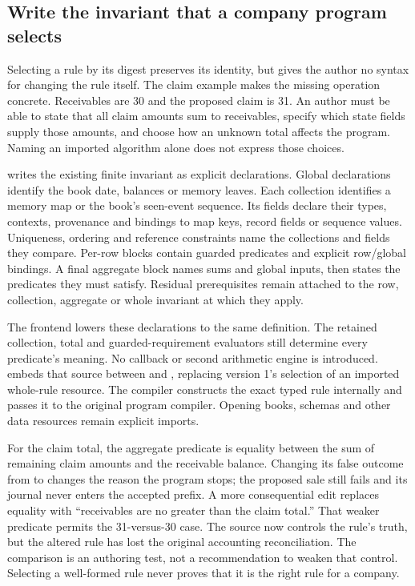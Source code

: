 \subsection{Write the invariant that a company program selects}
\label{sec:invariant-source-authoring}

Selecting a rule by its digest preserves its identity, but gives the author no
syntax for changing the rule itself. The claim example makes the missing
operation concrete. Receivables are 30 and the proposed claim is 31. An author
must be able to state that all claim amounts sum to receivables, specify which
state fields supply those amounts, and choose how an unknown total affects the
program. Naming an imported algorithm alone does not express those choices.

 writes the existing finite invariant as
explicit declarations. Global declarations identify the book date, balances or
memory leaves. Each collection identifies a memory map or the book's seen-event
sequence. Its fields declare their types, contexts, provenance and bindings to
map keys, record fields or sequence values. Uniqueness, ordering and reference
constraints name the collections and fields they compare. Per-row blocks
contain guarded predicates and explicit row/global bindings. A final aggregate
block names sums and global inputs, then states the predicates they must satisfy.
Residual prerequisites remain attached to the row, collection, aggregate or
whole invariant at which they apply.

The frontend lowers these declarations to the same 
definition. The retained collection, total and guarded-requirement evaluators
still determine every predicate's meaning. No callback or second arithmetic
engine is introduced.  embeds that source between
 and , replacing
version 1's selection of an imported whole-rule resource. The compiler constructs
the exact typed rule internally and passes it to the original program compiler.
Opening books, schemas and other data resources remain explicit imports.

For the claim total, the aggregate predicate is equality between the sum of
remaining claim amounts and the receivable balance. Changing its false outcome
from  to  changes the reason the program stops;
the proposed sale still fails and its journal never enters the accepted prefix.
A more consequential edit replaces equality with ``receivables are no greater
than the claim total.'' That weaker predicate permits the 31-versus-30 case.
The source now controls the rule's truth, but the altered rule has lost the
original accounting reconciliation. The comparison is an authoring test, not a
recommendation to weaken that control. Selecting a well-formed rule never proves
that it is the right rule for a company.

